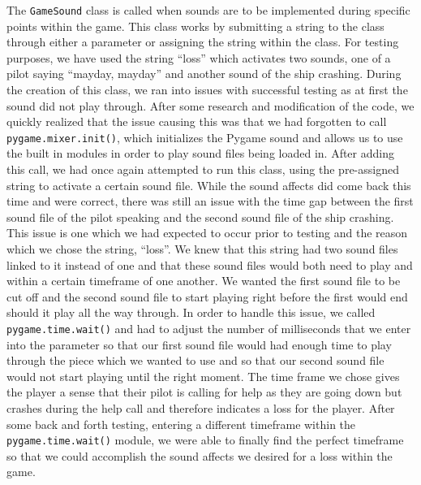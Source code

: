 The \texttt{GameSound} class is called when sounds are
to be implemented during specific points within the game. This class
works by submitting a string to the class through either a parameter
or assigning the string within the class. For testing purposes, we
have used the string “loss” which activates two sounds, one of a
pilot saying “mayday, mayday” and another sound of the ship
crashing.  During the creation of this class, we ran into issues
with successful testing as at first the sound did not play through.
After some research and modification of the code, we quickly
realized that the issue causing this was that we had forgotten to
call \texttt{pygame.mixer.init()}, which initializes the
Pygame sound and allows us to use the built in modules in order to
play sound files being loaded in. After adding this call, we had
once again attempted to run this class, using the pre-assigned
string to activate a certain sound file. While the sound affects did
come back this time and were correct, there was still an issue with
the time gap between the first sound file of the pilot speaking and
the second sound file of the ship crashing. This issue is one which
we had expected to occur prior to testing and the reason which we
chose the string, “loss”. We knew that this string had two sound
files linked to it instead of one and that these sound files would
both need to play and within a certain timeframe of one another.  We
wanted the first sound file to be cut off and the second sound file
to start playing right before the first would end should it play all
the way through. In order to handle this issue, we called
\texttt{pygame.time.wait()} and had to adjust the number
of milliseconds that we enter into the parameter so that our first
sound file would had enough time to play through the piece which we
wanted to use and so that our second sound file would not start
playing until the right moment. The time frame we chose gives the
player a sense that their pilot is calling for help as they are
going down but crashes during the help call and therefore indicates
a loss for the player. After some back and forth testing, entering a
different timeframe within the \texttt{pygame.time.wait()}
module, we were able to finally find the perfect timeframe so that
we could accomplish the sound affects we desired for a loss within
the game.

